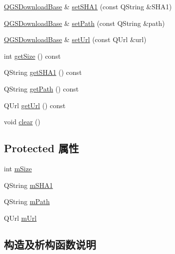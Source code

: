 \begin{DoxyCompactItemize}
\mbox{\hyperlink{class_q_g_s_download_base}{Q\+G\+S\+Download\+Base}} \& \mbox{\hyperlink{class_q_g_s_download_base_a15846aef72d941c8fad7e9af93a3b860}{set\+S\+H\+A1}} (const Q\+String \&S\+H\+A1)
\item 
\mbox{\hyperlink{class_q_g_s_download_base}{Q\+G\+S\+Download\+Base}} \& \mbox{\hyperlink{class_q_g_s_download_base_a8aaa585b65964be5e18c36c9e56a6726}{set\+Path}} (const Q\+String \&path)
\item 
\mbox{\hyperlink{class_q_g_s_download_base}{Q\+G\+S\+Download\+Base}} \& \mbox{\hyperlink{class_q_g_s_download_base_ae35bbc6d7d2e227e9002cd5a8c7a432f}{set\+Url}} (const Q\+Url \&url)
\item 
int \mbox{\hyperlink{class_q_g_s_download_base_ab5ab98012ff79431c3a221f4d872f08b}{get\+Size}} () const
\item 
Q\+String \mbox{\hyperlink{class_q_g_s_download_base_a1cb20288bdb358cebb9f907637b09d00}{get\+S\+H\+A1}} () const
\item 
Q\+String \mbox{\hyperlink{class_q_g_s_download_base_ad8ba04d474572db58a371b8bc06332b7}{get\+Path}} () const
\item 
Q\+Url \mbox{\hyperlink{class_q_g_s_download_base_a1d99572952de161b00e8f0b55c4c1b57}{get\+Url}} () const
\item 
void \mbox{\hyperlink{class_q_g_s_download_base_a70559b338d265667cdfd1cfda9dfe36f}{clear}} ()
\end{DoxyCompactItemize}
\subsection*{Protected 属性}
\begin{DoxyCompactItemize}
\item 
int \mbox{\hyperlink{class_q_g_s_download_base_a2a3948706924ac8ffa6c777ddaacb442}{m\+Size}}
\item 
Q\+String \mbox{\hyperlink{class_q_g_s_download_base_aedb79cadb150c52060a81b5f2422472c}{m\+S\+H\+A1}}
\item 
Q\+String \mbox{\hyperlink{class_q_g_s_download_base_a0ee55b7c470a0bf8993fb854136c8e7e}{m\+Path}}
\item 
Q\+Url \mbox{\hyperlink{class_q_g_s_download_base_a9fc0a75f3447b94a27fc671a17d4e5e9}{m\+Url}}
\end{DoxyCompactItemize}


\subsection{构造及析构函数说明}
\mbox{\label{class_q_g_s_download_base_a6968227b9537ee1f171f84cf9f5cb0e9}} 
